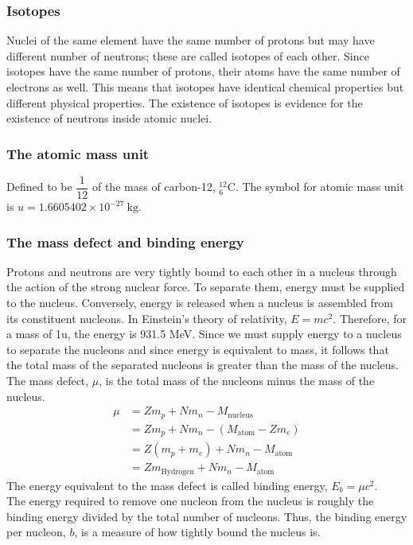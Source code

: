 \documentclass[a4paper,12pt]{article}
\begin{document}
\subsubsection*{Isotopes}
Nuclei of the same element have the same number of protons but may have different number of neutrons; these are called isotopes of each other. Since isotopes have the same number of protons, their atoms have the same number of electrons as well. This means that isotopes have identical chemical properties but different physical properties. The existence of isotopes is evidence for the existence of neutrons inside atomic nuclei.
\subsubsection*{The atomic mass unit}
Defined to be $\dfrac{1}{12}$ of the mass of carbon-12, $^{12}_6\text{C}$. The symbol for atomic mass unit is $u=1.6605402 \times 10^{-27}\ \text{kg}$.
\subsubsection*{The mass defect and binding energy}
Protons and neutrons are very tightly bound to each other in a nucleus through the action of the strong nuclear force. To separate them, energy must be supplied to the nucleus. Conversely, energy is released when a nucleus is assembled from its constituent nucleons.
In Einstein's theory of relativity, $E=mc^2$. Therefore, for a mass of 1u, the energy is 931.5 MeV. Since we must supply energy to a nucleus to separate the nucleons and since energy is equivalent to mass, it follows that the total mass of the separated nucleons is greater than the mass of the nucleus. The mass defect, $\mu$, is the total mass of the nucleons minus the mass of the nucleus.
\[
\begin{aligned}
\mu&=Zm_p+Nm_n-M_\text{nucleus}\\
&=Zm_p+Nm_n-(M_\text{atom}-Zm_e)\\
&=Z(m_p+m_e)+Nm_n-M_\text{atom}\\
&=Zm_\text{Hydrogen}+Nm_n-M_\text{atom}
\end{aligned}\]
The energy equivalent to the mass defect is called binding energy, $E_b=\mu c^2$.\\
The energy required to remove one nucleon from the nucleus is roughly the binding energy divided by the total number of nucleons. Thus, the binding energy per nucleon, $b$, is a measure of how tightly bound the nucleus is.
\end{document}
